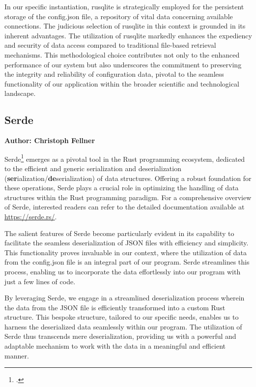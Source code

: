 In our specific instantiation, rusqlite is strategically employed for the persistent storage of the config.json file, a repository of vital data concerning 
available connections. The judicious selection of rusqlite in this context is grounded in its inherent advantages. The utilization of rusqlite markedly enhances 
the expediency and security of data access compared to traditional file-based retrieval mechanisms. This methodological choice contributes not only to the 
enhanced performance of our system but also underscores the commitment to preserving the integrity and reliability of configuration data, pivotal to the seamless
functionality of our application within the broader scientific and technological landscape.

\subsection{Serde}
\textbf{Author: Christoph Fellner}

Serde\footcite{serde} emerges as a pivotal tool in the Rust programming ecosystem, dedicated to the efficient and generic serialization and deserialization 
(\textbf{ser}ialization/\textbf{de}serialization) of data structures. Offering a robust foundation for these operations, Serde plays a crucial role in optimizing
the handling of data structures within the Rust programming paradigm. For a comprehensive overview of Serde, interested readers can refer to the detailed 
documentation available at \href{https://serde.rs/}{https://serde.rs/}.\newline

The salient features of Serde become particularly evident in its capability to facilitate the seamless deserialization of JSON files with efficiency and 
simplicity. This functionality proves invaluable in our context, where the utilization of data from the config.json file is an integral part of our program. 
Serde streamlines this process, enabling us to incorporate the data effortlessly into our program with just a few lines of code.\newline

By leveraging Serde, we engage in a streamlined deserialization process wherein the data from the JSON file is efficiently transformed into a custom Rust 
structure. This bespoke structure, tailored to our specific needs, enables us to harness the deserialized data seamlessly within our program. The utilization of
Serde thus transcends mere deserialization, providing us with a powerful and adaptable mechanism to work with the data in a meaningful and efficient manner.\newline

